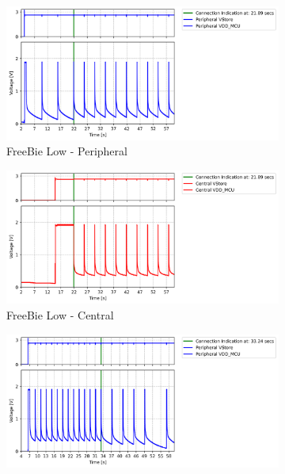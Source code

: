 \begin{figure}[t]
    \begin{subfigure}{0.5\linewidth}
        \centering
        \includegraphics[width=1\linewidth]{chapters/Results/Connection_Freebie_low_peripheral.png}
        \caption{\scriptsize{FreeBie Low - Peripheral}}
        \vspace{1\baselineskip}
    \end{subfigure}\hfill
    \begin{subfigure}{0.5\linewidth}
        \centering
        \includegraphics[width=1\linewidth]{chapters/Results/Connection_Freebie_low_central.png}
        \caption{\scriptsize{FreeBie Low - Central}}
        \vspace{1\baselineskip}
    \end{subfigure}
    \begin{subfigure}{0.5\linewidth}
        \centering
        \includegraphics[width=1\linewidth]{chapters/Results/Connection_Freebie_medium_peripheral.png}

\end{subfigure}
\end{figure}
